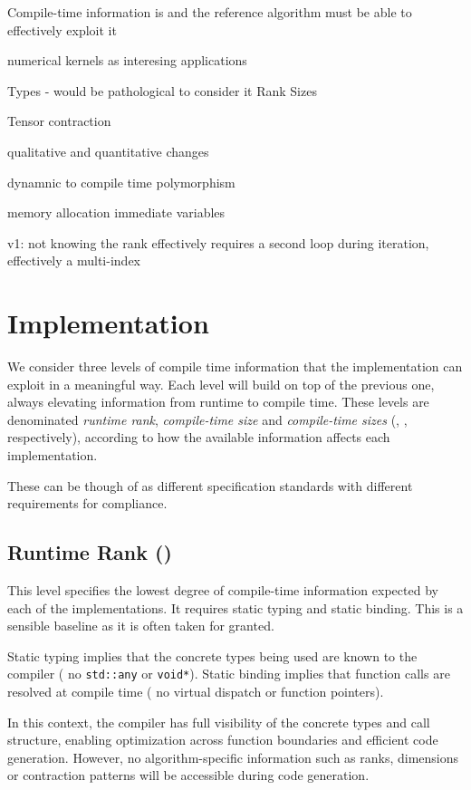 \documentclass[conference]{IEEEtran}
\begin{document}
Compile-time information is and the reference algorithm must be able to
effectively exploit it

numerical kernels as interesing applications

Types - would be pathological to consider it
Rank
Sizes

Tensor contraction 

qualitative and quantitative changes

dynamnic to compile time polymorphism

memory allocation
immediate variables


v1: not knowing the rank effectively requires a second loop during iteration,
effectively a multi-index

\section{Implementation}

We consider three levels of compile time information that the implementation can
exploit in a meaningful way.
Each level will build on top of the previous one, always elevating information
from runtime to compile time.
These levels are denominated \textit{runtime rank}, \textit{compile-time size}
and \textit{compile-time sizes} (, , 
respectively), according to how the available information affects each
implementation.

These can be though of as different specification standards with different
requirements for compliance.

\subsection{Runtime Rank ()}

This level specifies the lowest degree of compile-time information expected by
each of the implementations.
It requires static typing and static binding.
This is a sensible baseline as it is often taken for granted.

Static typing implies that the concrete types being used are known to the
compiler (\ie{} no \texttt{std::any} or \texttt{void*}).
Static binding implies that function calls are resolved at compile time (\ie{}
no virtual dispatch or function pointers).

In this context, the compiler has full visibility of the concrete
types and call structure, enabling optimization across function boundaries and
efficient code generation.
However, no algorithm-specific information such as ranks, dimensions or
contraction patterns will be accessible during code generation.
\end{document}
